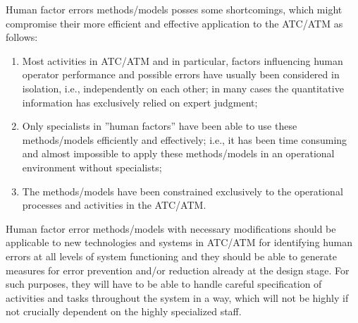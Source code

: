 \documentclass[a4paper, 10pt]{article}
\begin{document}
Human factor errors methods/models posses some
shortcomings, which might compromise their more efficient
and effective application to the ATC/ATM as follows:
\begin{enumerate}
		\item Most activities in ATC/ATM and in particular, factors
influencing human operator performance and possible errors
have usually been considered in isolation, i.e., independently
on each other; in many cases the quantitative information has
exclusively relied on expert judgment;
\item Only specialists in ”human factors” have been able to
use these methods/models efficiently and effectively; i.e., it has
been time consuming and almost impossible to apply these
methods/models in an operational environment without
specialists;
\item The methods/models have been constrained exclusively
to the operational processes and activities in the ATC/ATM.
\end{enumerate}\par

Human factor error methods/models with necessary
modifications should be applicable to new technologies and
systems in ATC/ATM for identifying human errors at all levels
of system functioning and they should be able to generate
measures for error prevention and/or reduction already at the
design stage. For such purposes, they will have to be able to
handle careful specification of activities and tasks throughout
the system in a way, which will not be highly if not crucially
dependent on the highly specialized staff.
\end{document}
